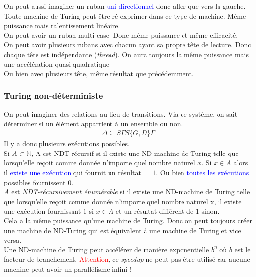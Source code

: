 \documentclass{report}
\begin{document}
On peut aussi imaginer un ruban \textcolor{blue}{uni-directionnel} donc aller que vers la gauche. Toute machine de Turing peut être ré-exprimer dans ce type de machine. Même puissance mais ralentissement linéaire.\\
On peut avoir un ruban multi case. Donc même puissance et même efficacité.\\

On peut avoir plusieurs rubans avec chacun ayant sa propre tête de lecture. Donc chaque tête est indépendante (\textit{thread}). On aura toujours la même puissance mais une accélération quasi quadratique.\\
Ou bien avec plusieurs tête, même résultat que précédemment.

\subsubsection{Turing non-déterministe}
On peut imaginer des relations au lieu de transitions. Via ce système, on sait déterminer si un élément appartient à un ensemble ou non.
\begin{align*}
\Delta \subseteq S \Gamma S \{G,D\} \Gamma
\end{align*}
Il y a donc plusieurs exécutions possibles.\\
Si $A \subset \mathbb{N}$, A est NDT-récursif si il existe une ND-machine de Turing telle que lorsqu’elle reçoit comme donnée n’importe quel nombre naturel $x$. Si $x \in A$ alors il \textcolor{blue}{existe une exécution} qui fournit un résultat $=1$. Ou bien \textcolor{blue}{toutes les exécutions} possibles fournissent $0$.\\

$A$ est \textit{NDT-récursivement énumérable} si il existe une ND-machine de Turing telle que lorsqu'elle reçoit comme donnée n'importe quel nombre naturel x, il existe une exécution fournissant $1$ si $x \in A$ et un résultat différent de $1$ sinon.\\

Cela a la même puissance qu'une machine de Turing. Donc on peut toujours créer une machine de ND-Turing qui est équivalent à une machine de Turing et vice versa.\\
Une ND-machine de Turing peut accélérer de manière exponentielle $b^n$ où $b$ est le facteur de branchement. \textcolor{red}{Attention}, ce \textit{speedup} ne peut pas être utilisé car aucune machine peut avoir un parallélisme infini !
\end{document}
